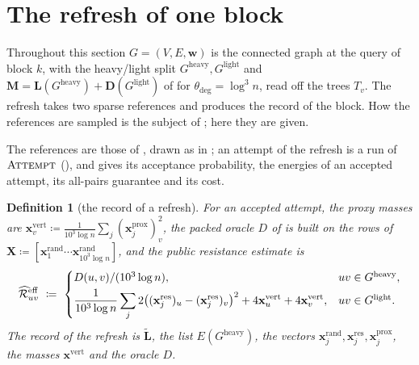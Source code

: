 \documentclass[11pt]{article}
\newtheorem{definition}[theorem]{Definition}
\theoremstyle{remark}
\newcommand{\DD}{\mathbf D}
\newcommand{\LL}{\mathbf L}
\newcommand{\LLtil}{{\widetilde{\LL}}}
\newcommand{\MM}{\mathbf M}
\newcommand{\ww}{\mathbf w}
\newcommand{\xx}{\mathbf x}
\newcommand{\XX}{\mathbf X}
\newcommand{\xxproxy}{\xx^{\mathrm{prox}}}
\newcommand{\xxrand}{\xx^{\mathrm{rand}}}
\newcommand{\xxres}{\xx^{\mathrm{res}}}
\newcommand{\xxvert}{\xx^{\mathrm{vert}}}
\newcommand{\dheavy}{\theta_{\deg}}
\newcommand{\Gh}{G^{\mathrm{heavy}}}
\newcommand{\Gl}{G^{\mathrm{light}}}
\newcommand{\Rcal}{\mathcal{R}}
\newcommand{\Reffref}{\mathrlap{\widehat{\phantom{\Rcal}\mkern4mu}}\Rcal^{\mathrm{eff}}}
\newcommand{\defeq}{\coloneqq}
\begin{document}
\section{The refresh of one block}\label{sec:refresh}

Throughout this section $G=(V,E,\ww)$ is the connected graph at the query of
block $k$, with the heavy/light split $\Gh,\Gl$ and $\MM=\LL(\Gh)+\DD(\Gl)$ of
 for $\dheavy=\log^{3}n$, read off the trees $T_v$.
The refresh takes two sparse references and produces the record of the
block.
How the references are sampled is the subject of ; here
they are given.

The references are those of , drawn as in
; an attempt of the refresh is a run of
$\textsc{Attempt}$ (), and  gives its
acceptance probability, the energies  of an accepted
attempt, its all-pairs guarantee and its cost.

\begin{definition}[the record of a refresh]\label{def:record}
For an accepted attempt, the \emph{proxy masses} are
$\xxvert_v\defeq\frac1{10^{3}\log n}\sum_j(\xxproxy_j)_v^{2}$, the packed oracle
$D$ of  is built on the rows of
$\XX\defeq[\xxrand_1\cdots\xxrand_{10^{3}\log n}]$, and the \emph{public resistance
estimate} is
\begin{equation}\label{eq:score}
\Reffref_{uv}\ \defeq\
\begin{cases}
D(u,v)/(10^{3}\log n), & uv\in\Gh,\\[3pt]
\dfrac1{10^{3}\log n}\displaystyle\sum_j2\bigl((\xxres_j)_u-(\xxres_j)_v\bigr)^{2}
+4\xxvert_u+4\xxvert_v, & uv\in\Gl .
\end{cases}
\end{equation}
The \emph{record} of the refresh is $\LLtil$, the list $E(\Gh)$, the vectors
$\xxrand_j,\xxres_j,\xxproxy_j$, the masses $\xxvert$ and the oracle $D$.
\end{definition}
\end{document}
